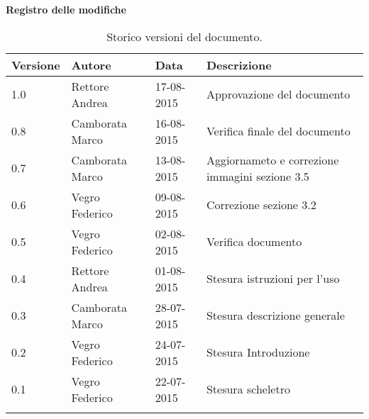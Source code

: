 \begin{Large}
	\textbf{Registro delle modifiche}
\end{Large}

\begin{longtable}{|l|l|l|p{}|}
\hline
\textbf{Versione} & \textbf{Autore} & \textbf{Data} & \textbf{Descrizione} \\
\hline
1.0 & Rettore Andrea & 17-08-2015 & Approvazione del documento \\
\hline
0.8 & Camborata Marco & 16-08-2015 & Verifica finale del documento \\
\hline
0.7 & Camborata Marco & 13-08-2015 & Aggiornameto e correzione immagini sezione 3.5 \\
\hline
0.6 & Vegro Federico & 09-08-2015 & Correzione sezione 3.2 \\
\hline
0.5 & Vegro Federico & 02-08-2015 & Verifica documento \\
\hline
0.4 & Rettore Andrea & 01-08-2015 & Stesura istruzioni per l'uso \\
\hline
0.3 & Camborata Marco & 28-07-2015 & Stesura descrizione generale \\
\hline
0.2 & Vegro Federico & 24-07-2015 & Stesura Introduzione \\
\hline
0.1 & Vegro Federico & 22-07-2015 & Stesura scheletro \\
\hline
\caption{Storico versioni del documento.}
\end{longtable}
